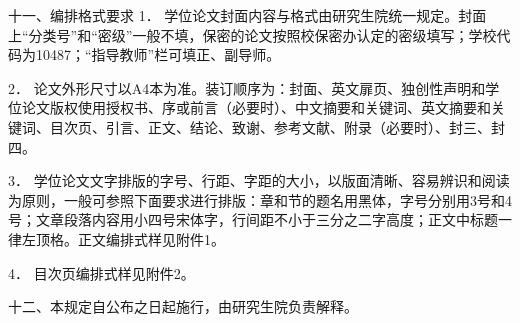 十一、编排格式要求
1． 学位论文封面内容与格式由研究生院统一规定。封面上“分类号”和“密级”一般不填，保密的论文按照校保密办认定的密级填写；学校代码为10487；“指导教师”栏可填正、副导师。

2． 论文外形尺寸以A4本为准。装订顺序为：封面、英文扉页、独创性声明和学位论文版权使用授权书、序或前言（必要时）、中文摘要和关键词、英文摘要和关键词、目次页、引言、正文、结论、致谢、参考文献、附录（必要时）、封三、封四。

3． 学位论文文字排版的字号、行距、字距的大小，以版面清晰、容易辨识和阅读为原则，一般可参照下面要求进行排版：章和节的题名用黑体，字号分别用3号和4号；文章段落内容用小四号宋体字，行间距不小于三分之二字高度；正文中标题一律左顶格。正文编排式样见附件1。

4． 目次页编排式样见附件2。

十二、本规定自公布之日起施行，由研究生院负责解释。